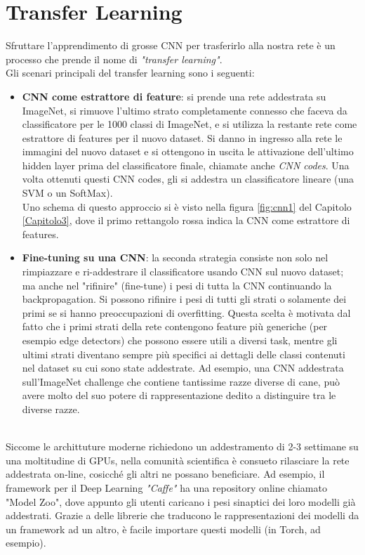 \section{Transfer Learning}
Sfruttare l'apprendimento di grosse CNN per trasferirlo alla nostra rete è un processo che prende il nome di \emph{"transfer learning"}. \\
Gli scenari principali del transfer learning sono i seguenti: 
\begin{itemize}	
\item \textbf{CNN come estrattore di feature}: si prende una rete addestrata su ImageNet, si rimuove l'ultimo strato completamente connesso che faceva da classificatore per le 1000 classi di ImageNet, e si utilizza la restante rete come estrattore di features per il nuovo dataset. Si danno in ingresso alla rete le immagini del nuovo dataset e si ottengono in uscita le attivazione dell'ultimo hidden layer prima del classificatore finale, chiamate anche \emph{CNN codes}. Una volta ottenuti questi CNN codes, gli si addestra un classificatore lineare (una SVM o un SoftMax).
\\
Uno schema di questo approccio si è visto nella figura \ref{fig:cnn1} del Capitolo \ref{Capitolo3}, dove il primo rettangolo rossa indica la CNN come estrattore di features. 
\item \textbf{Fine-tuning su una CNN}: la seconda strategia consiste non solo nel rimpiazzare e ri-addestrare il classificatore usando CNN sul nuovo dataset; ma anche nel "rifinire" (fine-tune) i pesi di tutta la CNN continuando la backpropagation. Si possono rifinire i pesi di tutti gli strati o solamente dei primi se si hanno preoccupazioni di overfitting. Questa scelta è motivata dal fatto che i primi strati della rete contengono feature più generiche (per esempio edge detectors) che possono essere utili a diversi task, mentre gli ultimi strati diventano sempre più specifici ai dettagli delle classi contenuti nel dataset su cui sono state addestrate. Ad esempio, una CNN addestrata sull'ImageNet challenge che contiene tantissime razze diverse di cane, può avere molto del suo potere di rappresentazione dedito a distinguire tra le diverse razze. 
\end{itemize} \\
Siccome le archittuture moderne richiedono un addestramento di 2-3 settimane su una moltitudine di GPUs, nella comunità scientifica è consueto rilasciare la rete addestrata on-line, cosicché gli altri ne possano beneficiare. Ad esempio, il framework per il Deep Learning \emph{"Caffe"} ha una repository online chiamato "Model Zoo"\parencite{Wzoo}, dove appunto gli utenti caricano i pesi sinaptici dei loro modelli già addestrati. Grazie a delle librerie che traducono le rappresentazioni dei modelli da un framework ad un altro, è facile importare questi modelli (in Torch, ad esempio).   

